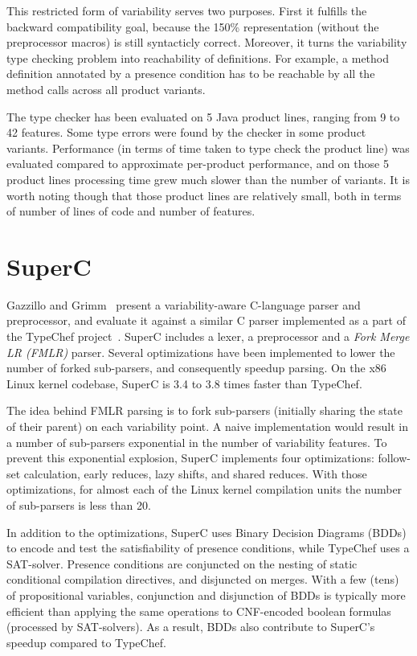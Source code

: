 \documentclass[11pt]{article}
\newcommand{\term}[1] {\emph{#1}}
\begin{document}
This restricted form of variability serves two purposes. First it fulfills the backward compatibility goal, because the 150\% representation (without the preprocessor macros) is still syntacticly correct. Moreover, it turns the variability type checking problem into reachability of definitions. For example, a method definition annotated by a presence condition has to be reachable by all the method calls across all product variants. 
 
The type checker has been evaluated on 5 Java product lines, ranging from 9 to 42 features. Some type errors were found by the checker in some product variants. Performance (in terms of time taken to type check the product line) was evaluated compared to approximate per-product performance, and on those 5 product lines processing time grew much slower than the number of variants. It is worth noting though that those product lines are relatively small, both in terms of number of lines of code and number of features. 

\section{SuperC}
Gazzillo and Grimm~\cite{Gazzillo:2012} present a variability-aware C-language parser and preprocessor, and evaluate it against a similar C parser implemented as a part of the TypeChef project~\cite{Kastner:2011, Kastner:2012}. SuperC includes a lexer, a preprocessor and a \term{Fork Merge LR (FMLR)} parser. Several optimizations have been implemented to lower the number of forked sub-parsers, and consequently speedup parsing. On the x86 Linux kernel codebase, SuperC is 3.4 to 3.8 times faster than TypeChef.

The idea behind FMLR parsing is to fork sub-parsers (initially sharing the state of their parent) on each variability point. A naive implementation would result in a number of sub-parsers exponential in the number of variability features. To prevent this exponential explosion, SuperC implements four optimizations: follow-set calculation, early reduces, lazy shifts, and shared reduces. With those optimizations, for almost each of the Linux kernel compilation units the number of sub-parsers is less than 20.

In addition to the optimizations, SuperC uses Binary Decision Diagrams (BDDs) to encode and test the satisfiability of presence conditions, while TypeChef uses a SAT-solver. Presence conditions are conjuncted on the nesting of static conditional compilation directives, and disjuncted on merges. With a few (tens) of propositional variables, conjunction and disjunction of BDDs is typically more efficient than applying the same operations to CNF-encoded boolean formulas (processed by SAT-solvers). As a result, BDDs also contribute to SuperC's speedup compared to TypeChef.
\end{document}
